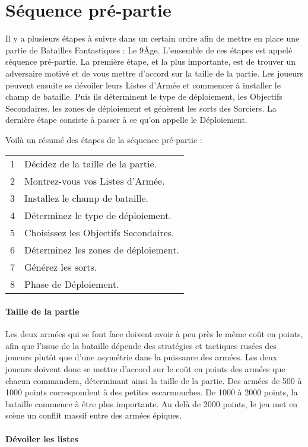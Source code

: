 
\part{Séquence pré-partie}

Il y a plusieurs étapes à suivre dans un certain ordre afin de mettre en place une partie de Batailles Fantastiques : Le 9\ieme Âge. L'ensemble de ces étapes est appelé séquence pré-partie. La première étape, et la plus importante, est de trouver un adversaire motivé et de vous mettre d'accord sur la taille de la partie. Les joueurs peuvent ensuite se dévoiler leurs Listes d'Armée et commencer à installer le champ de bataille. Puis ils déterminent le type de déploiement, les Objectifs Secondaires, les zones de déploiement et génèrent les sorts des Sorciers. La dernière étape consiste à passer à ce qu'on appelle le Déploiement.

Voilà un résumé des étapes de la séquence pré-partie :

\hspace*{0.3cm}
\begin{tabular}{c|l}
1 & Décidez de la taille de la partie. \tabularnewline
2 & Montrez-vous vos Listes d'Armée. \tabularnewline
3 & Installez le champ de bataille. \tabularnewline
4 & Déterminez le type de déploiement. \tabularnewline
5 & Choisissez les Objectifs Secondaires. \tabularnewline
6 & Déterminez les zones de déploiement. \tabularnewline
7 & Générez les sorts. \tabularnewline
8 & Phase de Déploiement. \tabularnewline
\end{tabular}

\subsection{Taille de la partie}

Les deux armées qui se font face doivent avoir à peu près le même coût en points, afin que l'issue de la bataille dépende des stratégies et tactiques rusées des joueurs plutôt que d'une asymétrie dans la puissance des armées. Les deux joueurs doivent donc se mettre d'accord sur le coût en points des armées que chacun commandera, déterminant ainsi la taille de la partie. Des armées de 500 à 1000 points correspondent à des petites escarmouches. De 1000 à 2000 points, la bataille commence à être plus importante. Au delà de 2000 points, le jeu met en scène un conflit massif entre des armées épiques.

\subsection{Dévoiler les listes}

